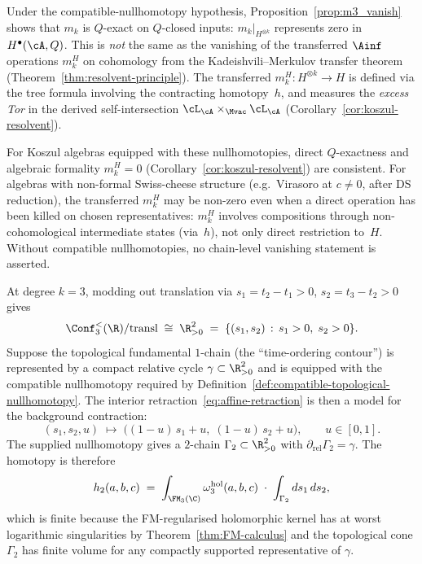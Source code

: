 \begin{remark}
\label{rem:chain-vs-transferred}
Under the compatible-nullhomotopy hypothesis,
Proposition~\ref{prop:m3_vanish} shows that $m_k$ is
$Q$-exact on $Q$-closed inputs: $m_k|_{H^{\otimes k}}$
represents zero in $H^\bullet(\cA, Q)$. This is \emph{not}
the same as the vanishing of the transferred $\Ainf$
operations $m_k^H$ on cohomology from the Kadeishvili--Merkulov
transfer theorem
(Theorem~\ref{thm:resolvent-principle}). The transferred
$m_k^H\colon H^{\otimes k} \to H$ is defined via the tree
formula involving the contracting homotopy~$h$, and
measures the \emph{excess Tor} in the derived
self-intersection $\cL_\cA \times_{\Mvac} \cL_\cA$
(Corollary~\ref{cor:koszul-resolvent}).

For Koszul algebras equipped with these nullhomotopies, direct
$Q$-exactness and algebraic formality $m_k^H = 0$
(Corollary~\ref{cor:koszul-resolvent}) are consistent.
For algebras with non-formal Swiss-cheese structure (e.g.\ Virasoro at
$c \neq 0$, after DS reduction), the transferred $m_k^H$ may be
non-zero even when a direct operation has been killed on chosen
representatives: $m_k^H$ involves compositions through
non-cohomological intermediate states (via~$h$), not only direct
restriction to~$H$. Without compatible nullhomotopies, no
chain-level vanishing statement is asserted.
\end{remark}

\begin{example}[Explicit contraction at $k=3$]
\label{ex:k3-contraction}
At degree $k=3$, modding out translation via $s_1=t_2-t_1>0$, $s_2=t_3-t_2>0$
gives
\[
\Conf_3^{<}(\R)/\mathrm{transl}
\;\cong\;
\R^2_{>0}
\;=\;
\{(s_1,s_2)\,:\,s_1>0,\;s_2>0\}.
\]
Suppose the topological fundamental $1$-chain (the ``time-ordering
contour'') is represented by a compact relative cycle
$\gamma\subset\R^2_{>0}$ and is equipped with the compatible
nullhomotopy required by
Definition~\ref{def:compatible-topological-nullhomotopy}. The
interior retraction~\eqref{eq:affine-retraction} is then a model for
the background contraction:
\[
(s_1,s_2,u)\;\longmapsto\;
\bigl((1-u)\,s_1+u,\;(1-u)\,s_2+u\bigr),
\qquad u\in[0,1].
\]
The supplied nullhomotopy gives a $2$-chain
$\Gamma_2\subset\R^2_{>0}$ with
$\partial_{\mathrm{rel}}\Gamma_2=\gamma$.
The homotopy is therefore
\[
h_2(a,b,c)
\;=\;
\int_{\FM_3(\C)}
\omega_3^{\mathrm{hol}}(a,b,c)
\;\cdot\;
\int_{\Gamma_2}ds_1\,ds_2,
\]
which is finite because the FM-regularised holomorphic kernel has at worst logarithmic
singularities by Theorem~\ref{thm:FM-calculus} and the topological cone $\Gamma_2$ has finite volume
for any compactly supported representative of $\gamma$.
\end{example}

